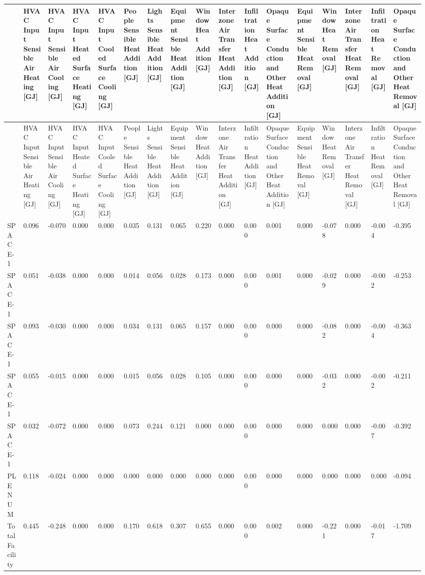 {\tiny
\begin{longtable}[c]{>{\raggedright}p{0.28in}>{\raggedright}p{0.28in}>{\raggedright}p{0.28in}>{\raggedright}p{0.28in}>{\raggedright}p{0.28in}>{\raggedright}p{0.28in}>{\raggedright}p{0.28in}>{\raggedright}p{0.28in}>{\raggedright}p{0.28in}>{\raggedright}p{0.28in}>{\raggedright}p{0.28in}>{\raggedright}p{0.28in}>{\raggedright}p{0.28in}>{\raggedright}p{0.28in}>{\raggedright}p{0.28in}>{\raggedright}p{0.28in}>{\raggedright}p{0.28in}}
\toprule 
 & HVAC Input Sensible Air Heating [GJ] & HVAC Input Sensible Air Cooling [GJ] & HVAC Input Heated Surface Heating [GJ] & HVAC Input Cooled Surface Cooling [GJ] & People Sensible Heat Addition [GJ] & Lights Sensible Heat Addition [GJ] & Equipment Sensible Heat Addition [GJ] & Window Heat Addition [GJ] & Interzone Air Transfer Heat Addition [GJ] & Infiltration Heat Addition [GJ] & Opaque Surface Conduction and Other Heat Addition [GJ] & Equipment Sensible Heat Removal [GJ] & Window Heat Removal [GJ] & Interzone Air Transfer Heat Removal [GJ] & Infiltration Heat Removal [GJ] & Opaque Surface Conduction and Other Heat Removal [GJ] \tabularnewline
\midrule
\endfirsthead

\toprule 
 & HVAC Input Sensible Air Heating [GJ] & HVAC Input Sensible Air Cooling [GJ] & HVAC Input Heated Surface Heating [GJ] & HVAC Input Cooled Surface Cooling [GJ] & People Sensible Heat Addition [GJ] & Lights Sensible Heat Addition [GJ] & Equipment Sensible Heat Addition [GJ] & Window Heat Addition [GJ] & Interzone Air Transfer Heat Addition [GJ] & Infiltration Heat Addition [GJ] & Opaque Surface Conduction and Other Heat Addition [GJ] & Equipment Sensible Heat Removal [GJ] & Window Heat Removal [GJ] & Interzone Air Transfer Heat Removal [GJ] & Infiltration Heat Removal [GJ] & Opaque Surface Conduction and Other Heat Removal [GJ] \tabularnewline
\midrule
\endhead

SPACE\-1-1 & 0.096 & -0.070 & 0.000 & 0.000 & 0.035 & 0.131 & 0.065 & 0.220 & 0.000 & 0.000 & 0.001 & 0.000 & -0.078 & 0.000 & -0.004 & -0.395 \tabularnewline
SPACE\-2-1 & 0.051 & -0.038 & 0.000 & 0.000 & 0.014 & 0.056 & 0.028 & 0.173 & 0.000 & 0.000 & 0.001 & 0.000 & -0.029 & 0.000 & -0.002 & -0.253 \tabularnewline
SPACE\-3-1 & 0.093 & -0.030 & 0.000 & 0.000 & 0.034 & 0.131 & 0.065 & 0.157 & 0.000 & 0.000 & 0.000 & 0.000 & -0.082 & 0.000 & -0.004 & -0.363 \tabularnewline
SPACE\-4-1 & 0.055 & -0.015 & 0.000 & 0.000 & 0.015 & 0.056 & 0.028 & 0.105 & 0.000 & 0.000 & 0.000 & 0.000 & -0.032 & 0.000 & -0.002 & -0.211 \tabularnewline
SPACE\-5-1 & 0.032 & -0.072 & 0.000 & 0.000 & 0.073 & 0.244 & 0.121 & 0.000 & 0.000 & 0.000 & 0.000 & 0.000 & 0.000 & 0.000 & -0.007 & -0.392 \tabularnewline
PLE\-NUM\--1 & 0.118 & -0.024 & 0.000 & 0.000 & 0.000 & 0.000 & 0.000 & 0.000 & 0.000 & 0.000 & 0.000 & 0.000 & 0.000 & 0.000 & 0.000 & -0.094 \tabularnewline
Total Facility & 0.445 & -0.248 & 0.000 & 0.000 & 0.170 & 0.618 & 0.307 & 0.655 & 0.000 & 0.000 & 0.002 & 0.000 & -0.221 & 0.000 & -0.017 & -1.709 \tabularnewline
\bottomrule
\end{longtable}}


